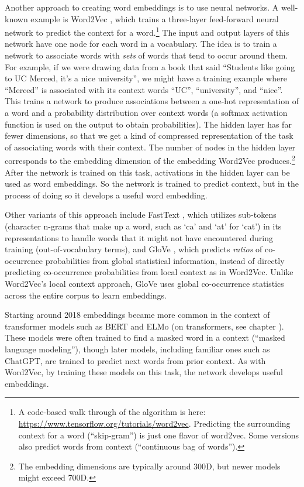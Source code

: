 Another approach to creating word embeddings is to use neural networks. A well-known example is Word2Vec \cite{mikolov2013distributed}, which trains a three-layer feed-forward neural network to predict the context for a word.\footnote{A code-based walk through of the algorithm is here: \url{https://www.tensorflow.org/tutorials/word2vec}. Predicting the surrounding context for a word (``skip-gram'') is just one flavor of word2vec. Some versions also predict words from context (``continuous bag of words''). } The input and output layers of this network have one node for each word in a vocabulary. The idea is to train a network to associate words with \emph{sets} of words that tend to occur around them. For example, if we were drawing data from a book that said ``Students like going to UC Merced, it's a nice university'', we might have a training example where ``Merced'' is associated with its context words ``UC'', ``university'', and ``nice''. 
This trains a network to produce associations between a one-hot representation of a word and a probability distribution over context words (a softmax activation function is used on the output to obtain probabilities).  The hidden layer has far fewer dimensions, so that we get a kind of compressed representation of the task of associating words with their context. The number of nodes in the hidden layer corresponds to the embedding dimension of the embedding Word2Vec produces.\footnote{The embedding dimensions are typically around 300D, but newer models might exceed 700D.}  After the network is trained on this task, activations in the hidden layer can be used as word embeddings. So the network is trained to predict context, but in the process of doing so it develops a useful word embedding. 

Other variants of this approach include FastText \cite{bojanowski2016enriching}, which utilizes sub-tokens (character n-grams that make up a word, such as `ca' and `at' for `cat') in its representations to handle words that it might not have encountered during training (out-of-vocabulary terms), and GloVe \cite{pennington2014glove}, which predicts \textit{ratios} of co-occurrence probabilities from global statistical information, instead of directly predicting co-occurrence probabilities from local context as in Word2Vec. Unlike Word2Vec's local context approach, GloVe uses global co-occurrence statistics across the entire corpus to learn embeddings. 

Starting around 2018 embeddings became more common in the context of transformer models such as BERT and ELMo  (on transformers, see chapter ). These models were often trained to find a masked word in a context (``masked language modeling''), though later models, including familiar ones such as ChatGPT, are trained to predict next words from prior context. As with Word2Vec, by training these models on this task, the network develops useful embeddings.  

